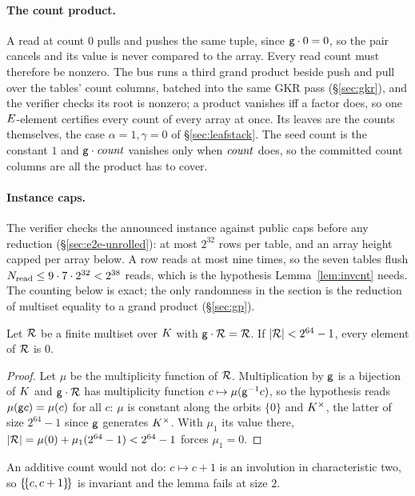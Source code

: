 \paragraph{The count product.} A read at count $0$ pulls and pushes the same tuple, since $\mathsf{g}\cdot0=0$, so the pair cancels and its value is never compared to the array. Every read count must therefore be nonzero. The bus runs a third grand product beside push and pull over the tables' count columns, batched into the same GKR pass (\S\ref{sec:gkr}), and the verifier checks its root is nonzero; a product vanishes iff a factor does, so one $E$-element certifies every count of every array at once. Its leaves are the counts themselves, the case $\alpha=1,\gamma=0$ of \S\ref{sec:leafstack}. The seed count is the constant $1$ and $\mathsf{g}\cdot\mathit{count}$ vanishes only when $\mathit{count}$ does, so the committed count columns are all the product has to cover.

\paragraph{Instance caps.} The verifier checks the announced instance against public caps before any reduction (\S\ref{sec:e2e-unrolled}): at most $2^{32}$ rows per table, and an array height capped per array below. A row reads at most nine times, so the seven tables flush $N_{\mathrm{read}}\le9\cdot7\cdot2^{32}<2^{38}$ reads, which is the hypothesis Lemma~\ref{lem:invcnt} needs. The counting below is exact; the only randomness in the section is the reduction of multiset equality to a grand product (\S\ref{sec:gp}).

\begin{lemma}\label{lem:invcnt}
Let $\mathcal{R}$ be a finite multiset over $K$ with $\mathsf{g}\cdot\mathcal{R}=\mathcal{R}$. If $|\mathcal{R}|<2^{64}-1$, every element of $\mathcal{R}$ is $0$.
\end{lemma}

\begin{proof}
Let $\mu$ be the multiplicity function of $\mathcal{R}$. Multiplication by $\mathsf{g}$ is a bijection of $K$ and $\mathsf{g}\cdot\mathcal{R}$ has multiplicity function $c\mapsto\mu(\mathsf{g}^{-1}c)$, so the hypothesis reads $\mu(\mathsf{g} c)=\mu(c)$ for all $c$: $\mu$ is constant along the orbits $\{0\}$ and $K^{\times}$, the latter of size $2^{64}-1$ since $\mathsf{g}$ generates $K^{\times}$. With $\mu_1$ its value there, $|\mathcal{R}|=\mu(0)+\mu_1(2^{64}-1)<2^{64}-1$ forces $\mu_1=0$.
\end{proof}

An additive count would not do: $c\mapsto c+1$ is an involution in characteristic two, so $\{\!\{c,c+1\}\!\}$ is invariant and the lemma fails at size $2$.

